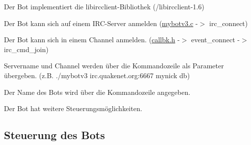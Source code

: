 \begin{DoxyItemize}
\item \-Der \-Bot implementiert die libircclient-\/\-Bibliothek (/libircclient-\/1.6)
\item \-Der \-Bot kann sich auf einem \-I\-R\-C-\/\-Server anmelden (\hyperlink{mybotv3_8c}{mybotv3.\-c} -\/$>$ irc\-\_\-connect)
\item \-Der \-Bot kann sich in einem \-Channel anmelden. (\hyperlink{callbk_8h}{callbk.\-h} -\/$>$ event\-\_\-connect -\/$>$ irc\-\_\-cmd\-\_\-join)
\item \-Servername und \-Channel werden über die \-Kommandozeile als \-Parameter übergeben. (z.\-B. ./mybotv3 irc.\-quakenet.\-org\-:6667 mynick db)
\item \-Der \-Name des \-Bots wird über die \-Kommandozeile angegeben.
\item \-Der \-Bot hat weitere \-Steuerungsmöglichkeiten. 
\end{DoxyItemize}\hypertarget{index_sec2_2}{}\subsection{\-Steuerung des Bots}\label{index_sec2_2}

